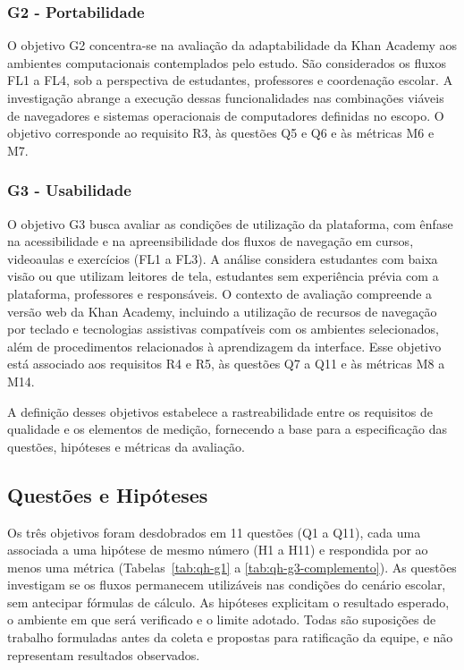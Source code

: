 \documentclass[sigconf, language=english, language=brazilian,natbib=false]{acmart}
\begin{document}
\subsubsection{G2 - Portabilidade}
O objetivo G2 concentra-se na avaliação da adaptabilidade
da Khan Academy aos ambientes computacionais contemplados
pelo estudo. São considerados os fluxos FL1 a FL4, sob a perspectiva de estudantes, professores
e coordenação escolar. A investigação abrange a execução
dessas funcionalidades nas combinações viáveis de
navegadores e sistemas operacionais de computadores
definidas no escopo. O objetivo corresponde ao requisito
R3, às questões Q5 e Q6 e às métricas M6 e M7.

\subsubsection{G3 - Usabilidade}

O objetivo G3 busca avaliar as condições de utilização
da plataforma, com ênfase na acessibilidade e na
apreensibilidade dos fluxos de navegação em cursos, videoaulas
e exercícios (FL1 a FL3). A análise considera estudantes com
baixa visão ou que utilizam leitores de tela, estudantes
sem experiência prévia com a plataforma, professores
e responsáveis. O contexto de avaliação compreende a
versão web da Khan Academy, incluindo a utilização de
recursos de navegação por teclado e tecnologias assistivas
compatíveis com os ambientes selecionados, além de
procedimentos relacionados à aprendizagem da interface.
Esse objetivo está associado aos requisitos R4 e R5,
às questões Q7 a Q11 e às métricas M8 a M14.

A definição desses objetivos estabelece a rastreabilidade
entre os requisitos de qualidade e os elementos de medição,
fornecendo a base para a especificação das questões,
hipóteses e métricas da avaliação.

\subsection{Questões e Hipóteses}

Os três objetivos foram desdobrados em 11 questões (Q1 a Q11), cada
uma associada a uma hipótese de mesmo número (H1 a H11) e respondida
por ao menos uma métrica
(Tabelas~\ref{tab:qh-g1} a \ref{tab:qh-g3-complemento}).
As questões investigam se os fluxos permanecem utilizáveis nas
condições do cenário escolar, sem antecipar fórmulas de cálculo.
As hipóteses explicitam o resultado esperado, o ambiente em que será
verificado e o limite adotado. Todas são suposições de trabalho
formuladas antes da coleta e propostas para ratificação da equipe,
e não representam resultados observados.
\end{document}
